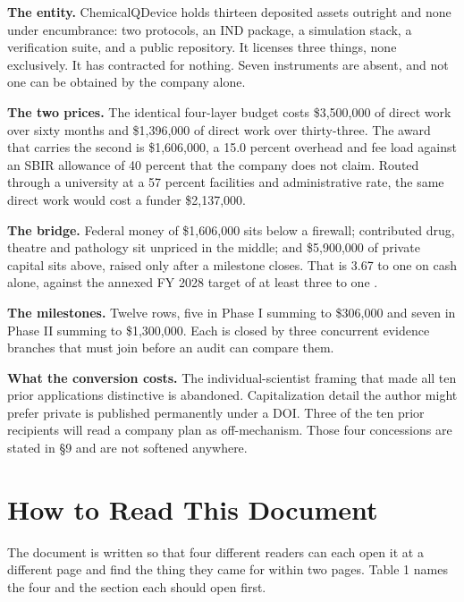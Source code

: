 \textbf{The entity.} ChemicalQDevice holds thirteen deposited assets outright
and none under encumbrance: two protocols, an IND package, a simulation stack, a
verification suite, and a public repository. It licenses three things, none
exclusively. It has contracted for nothing. Seven instruments are absent, and
not one can be obtained by the company alone.

\textbf{The two prices.} The identical four-layer budget costs \$3,500,000 of
direct work over sixty months and \$1,396,000 of direct work over thirty-three.
The award that carries the second is \$1,606,000, a 15.0 percent overhead and
fee load against an SBIR allowance of 40 percent that the company does not
claim. Routed through a university at a 57 percent facilities and administrative
rate, the same direct work would cost a funder \$2,137,000.

\textbf{The bridge.} Federal money of \$1,606,000 sits below a firewall;
contributed drug, theatre and pathology sit unpriced in the middle; and
\$5,900,000 of private capital sits above, raised only after a milestone closes.
That is 3.67 to one on cash alone, against the annexed FY 2028 target of at
least three to one \cite{kratsiosvought2026fy2028priorities}.

\textbf{The milestones.} Twelve rows, five in Phase I summing to \$306,000 and
seven in Phase II summing to \$1,300,000. Each is closed by three concurrent
evidence branches that must join before an audit can compare them.

\textbf{What the conversion costs.} The individual-scientist framing that made
all ten prior applications distinctive is abandoned. Capitalization detail the
author might prefer private is published permanently under a DOI. Three of the
ten prior recipients will read a company plan as off-mechanism. Those four
concessions are stated in \S9 and are not softened anywhere.

\section*{How to Read This Document}

The document is written so that four different readers can each open it at a
different page and find the thing they came for within two pages. Table 1 names
the four and the section each should open first.

